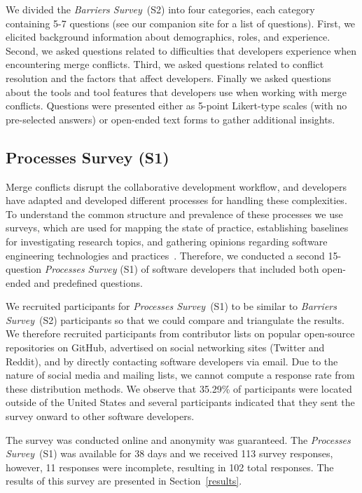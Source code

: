 We divided the \textit{Barriers Survey}~(S2) into four categories, each category containing 5-7 questions (see our companion site for a list of questions).
First, we elicited background information about demographics, roles, and experience.
Second, we asked questions related to difficulties that developers experience when encountering merge conflicts.
Third, we asked questions related to conflict resolution and the factors that affect developers.
Finally we asked questions about the tools and tool features that developers use when working with merge conflicts.
Questions were presented either as 5-point Likert-type scales (with no pre-selected answers) or open-ended text forms to gather additional insights.

\subsection{Processes Survey (S1)}\label{processes_survey}

Merge conflicts disrupt the collaborative development workflow, and developers have adapted and developed different processes for handling these complexities.
To understand the common structure and prevalence of these processes we use surveys, which are used for mapping the state of practice, establishing baselines for investigating research topics, and gathering opinions regarding software engineering technologies and practices~\cite{deMello2016survey}.
Therefore, we conducted a second 15-question \textit{Processes Survey} (S1) of software developers that included both open-ended and predefined questions.

We recruited participants for \textit{Processes Survey}~(S1) to be similar to \textit{Barriers Survey}~(S2) participants so that we could compare and triangulate the results.
We therefore recruited participants from contributor lists on popular open-source repositories on GitHub, advertised on social networking sites (Twitter and Reddit), and by directly contacting software developers via email.
Due to the nature of social media and mailing lists, we cannot compute a response rate from these distribution methods.
We observe that 35.29\% of participants were located outside of the United States and several participants indicated that they sent the survey onward to other software developers.

The survey was conducted online and anonymity was guaranteed.
The \textit{Processes Survey}~(S1) was available for 38 days and we received 113 survey responses, however, 11 responses were incomplete, resulting in 102 total responses.
The results of this survey are presented in Section~\ref{results}.

